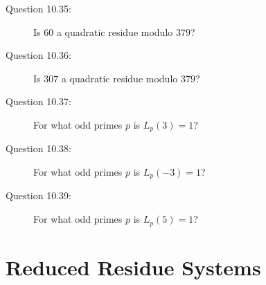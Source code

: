 \documentclass{article}
\begin{document}
\begin{description}
  \item[Question 10.35:] Is $60$ a quadratic residue modulo $379$?

  \item[Question 10.36:] Is $307$ a quadratic residue modulo $379$?

  \item[Question 10.37:] For what odd primes $p$ is $L_p(3)=1$?

  \item[Question 10.38:] For what odd primes $p$ is $L_p(-3)=1$?

  \item[Question 10.39:] For what odd primes $p$ is $L_p(5)=1$?

\end{description}


\section{Reduced Residue Systems}
\end{document}
